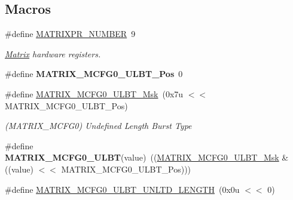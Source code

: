 \subsection*{Macros}
\begin{DoxyCompactItemize}
\item 
\mbox{\label{group__SAME70__MATRIX_gafdd5910e0fa935742d5f7a0ab3dd8004}} 
\#define \mbox{\hyperlink{group__SAME70__MATRIX_gafdd5910e0fa935742d5f7a0ab3dd8004}{M\+A\+T\+R\+I\+X\+P\+R\+\_\+\+N\+U\+M\+B\+ER}}~9
\begin{DoxyCompactList}\small\item\em \mbox{\hyperlink{structMatrix}{Matrix}} hardware registers. \end{DoxyCompactList}\item 
\mbox{\label{group__SAME70__MATRIX_gacdf8355a07696be09be884af4528a965}} 
\#define {\bfseries M\+A\+T\+R\+I\+X\+\_\+\+M\+C\+F\+G0\+\_\+\+U\+L\+B\+T\+\_\+\+Pos}~0
\item 
\mbox{\label{group__SAME70__MATRIX_ga0387cd5fd352f9c60e44a20f6b359665}} 
\#define \mbox{\hyperlink{group__SAME70__MATRIX_ga0387cd5fd352f9c60e44a20f6b359665}{M\+A\+T\+R\+I\+X\+\_\+\+M\+C\+F\+G0\+\_\+\+U\+L\+B\+T\+\_\+\+Msk}}~(0x7u $<$$<$ M\+A\+T\+R\+I\+X\+\_\+\+M\+C\+F\+G0\+\_\+\+U\+L\+B\+T\+\_\+\+Pos)
\begin{DoxyCompactList}\small\item\em (M\+A\+T\+R\+I\+X\+\_\+\+M\+C\+F\+G0) Undefined Length Burst Type \end{DoxyCompactList}\item 
\mbox{\label{group__SAME70__MATRIX_ga78a940ff2998526ba301620f186708ca}} 
\#define {\bfseries M\+A\+T\+R\+I\+X\+\_\+\+M\+C\+F\+G0\+\_\+\+U\+L\+BT}(value)~((\mbox{\hyperlink{group__SAMS70__MATRIX_ga0387cd5fd352f9c60e44a20f6b359665}{M\+A\+T\+R\+I\+X\+\_\+\+M\+C\+F\+G0\+\_\+\+U\+L\+B\+T\+\_\+\+Msk}} \& ((value) $<$$<$ M\+A\+T\+R\+I\+X\+\_\+\+M\+C\+F\+G0\+\_\+\+U\+L\+B\+T\+\_\+\+Pos)))
\item 
\mbox{\label{group__SAME70__MATRIX_ga31c3afc145f0373f9a8d6360114512c0}} 
\#define \mbox{\hyperlink{group__SAME70__MATRIX_ga31c3afc145f0373f9a8d6360114512c0}{M\+A\+T\+R\+I\+X\+\_\+\+M\+C\+F\+G0\+\_\+\+U\+L\+B\+T\+\_\+\+U\+N\+L\+T\+D\+\_\+\+L\+E\+N\+G\+TH}}~(0x0u $<$$<$ 0)
$$
\end{DoxyCompactItemize}
